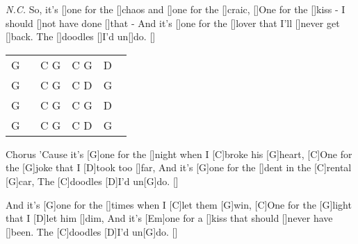 \begin{guitar}
	 {\footnotesize\textit{N.C.}}
	So, it's []one for the []chaos and []one for the []craic,
	[]One for the []kiss - I should []not have done []that -
	And it's []one for the []lover that I'll []never get []back. 
	The []doodles []I'd un[]do. []{}
	
	
	{\footnotesize\begin{tabular}{|l|l|l|l|}
			G ~ & C G & C G & D ~ \\
			G & C G & C D & G \\
			G & C G & C G & D \\
			G & C G & C D & G 
	\end{tabular}}
	
	\begin{chorus}{Chorus}
		'Cause it's [G]one for the []night when I [C]broke his [G]heart,
		[C]One for the [G]joke that I [D]took too []far,
		And it's [G]one for the []dent in the [C]rental [G]car,
		The [C]doodles [D]I'd un[G]do. []{}
		
		And it's [G]one for the []times when I [C]let them [G]win,
		[C]One for the [G]light that I [D]let him []dim,
		And it's [Em]one for a []kiss that should []never have []been. 
		The [C]doodles [D]I'd un[G]do. []{}%
	\end{chorus}
\end{guitar}